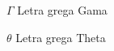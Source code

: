 
\begin{simbolos}
    \item[$ \Gamma $] Letra grega Gama
    \item[$ \theta $] Letra grega Theta
\end{simbolos}

